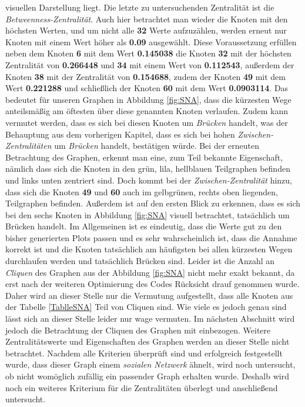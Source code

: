 visuellen Darstellung liegt. Die letzte zu untersuchenden Zentralität ist die \textit{Betweenness-Zentralität}. Auch hier betrachtet man wieder die Knoten mit den höchsten Werten, und um nicht alle \textbf{32} Werte aufzuzählen, werden erneut nur Knoten mit einem Wert höher als \textbf{0.09} ausgewählt. Diese Voraussetzung erfüllen neben dem Knoten \textbf{6} mit dem Wert \textbf{0.145038} die Knoten \textbf{32} mit der höchsten Zentralität von \textbf{0.266448} und \textbf{34} mit einem Wert von \textbf{0.112543}, außerdem der Knoten \textbf{38} mit der Zentralität von \textbf{0.154688}, zudem der Knoten \textbf{49} mit dem Wert \textbf{0.221288} und schließlich der Knoten \textbf{60} mit dem Wert \textbf{0.0903114}. Das bedeutet für unseren Graphen in Abbildung \ref{fig:SNA}, dass die kürzesten Wege anteilsmäßig am öftesten über diese genannten Knoten verlaufen. Zudem kann vermutet werden, dass es sich bei diesen Knoten um \textit{Brücken} handelt, was der Behauptung aus dem vorherigen Kapitel, dass es sich bei hohen \textit{Zwischen-Zentralitäten} um \textit{Brücken} handelt, bestätigen würde. Bei der erneuten Betrachtung des Graphen, erkennt man eine, zum Teil bekannte Eigenschaft, nämlich dass sich die Knoten in den grün, lila, hellblauen Teilgraphen befinden und links unten zentriert sind. Doch kommt bei der \textit{Zwischen-Zentralität} hinzu, dass sich die Knoten \textbf{49} und \textbf{60} auch im gelbgrünen, rechts oben liegenden, Teilgraphen befinden. Außerdem ist auf den ersten Blick zu erkennen, dass es sich bei den sechs Knoten in Abbildung \ref{fig:SNA} visuell betrachtet, tatsächlich um Brücken handelt. Im Allgemeinen ist es eindeutig, dass die Werte gut zu den bisher generierten Plots passen und es sehr wahrscheinlich ist, dass die Annahme korrekt ist und die Knoten tatsächlich am häufigsten bei allen kürzesten Wegen durchlaufen werden und tatsächlich Brücken sind. Leider ist die Anzahl an \textit{Cliquen} des Graphen aus der Abbildung \ref{fig:SNA} nicht mehr exakt bekannt, da erst nach der weiteren Optimierung des Codes Rücksicht drauf genommen wurde. Daher wird an dieser Stelle nur die Vermutung aufgestellt, dass alle Knoten aus der Tabelle \ref{TablleSNA} Teil von Cliquen sind. Wie viele es jedoch genau sind lässt sich an dieser Stelle leider nur wage vermuten. Im nächsten Abschnitt wird jedoch die Betrachtung der Cliquen des Graphen mit einbezogen. Weitere Zentralitätswerte und Eigenschaften des Graphen werden an dieser Stelle nicht betrachtet. Nachdem alle Kriterien überprüft sind und erfolgreich festgestellt wurde, dass dieser Graph einem \textit{sozialen Netzwerk} ähnelt, wird noch untersucht, ob nicht womöglich zufällig ein passender Graph erhalten wurde. Deshalb wird noch ein weiteres Kriterium für die Zentralitäten überlegt und anschließend untersucht.


